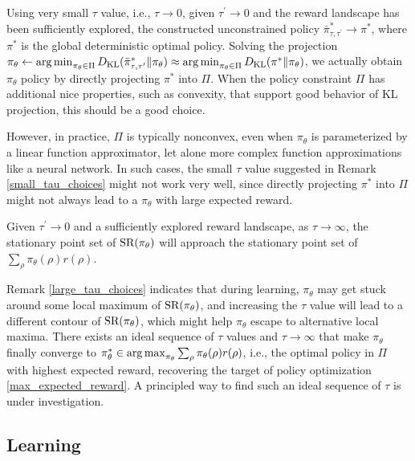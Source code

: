 \documentclass{article} %
\begin{document}
\begin{remk}
\label{small_tau_choices}
Using very small $\tau$ value, i.e., $\tau \to 0$, given $\tau^{\prime} \to 0$ and the reward landscape has been sufficiently explored, the constructed unconstrained policy $\bar{\pi}_{\tau,\tau^{\prime}}^* \to \pi^*$, where $\pi^*$ is the global deterministic optimal policy. Solving the projection $\pi_\theta \leftarrow \operatorname*{arg\,min}_{\pi_\theta \in \Pi}{D_{\mathrm{KL}}(\bar{\pi}_{\tau,\tau^{\prime}}^* \| \pi_\theta}) \approx \operatorname*{arg\,min}_{\pi_\theta \in \Pi}{D_{\mathrm{KL}}(\pi^* \| \pi_\theta})$, we actually obtain $\pi_\theta$ policy by directly projecting $\pi^*$ into $\Pi$. When the policy constraint $\Pi$ has additional nice properties, such as convexity, that support good behavior of KL projection, this should be a good choice.
\end{remk}
  
However, in practice, $\Pi$ is typically nonconvex, even when $\pi_\theta$ is parameterized by a linear function approximator, let alone more complex function approximations like a neural network. In such cases, the small $\tau$ value suggested in Remark \ref{small_tau_choices} might not work very well, since directly projecting $\pi^*$ into $\Pi$ might not always lead to a $\pi_\theta$ with large expected reward.

\begin{remk}
\label{large_tau_choices}
	Given $\tau^{\prime} \to 0$ and a sufficiently explored reward landscape, as $\tau \to \infty$, the stationary point set of $\text{SR}(\pi_\theta)$ will approach the stationary point set of $\sum_{\rho}{ \pi_\theta(\rho) r(\rho) }$.
\end{remk}

Remark \ref{large_tau_choices} indicates that during learning, $\pi_\theta$ may get stuck around some local maximum of $\text{SR}(\pi_\theta)$, and increasing the $\tau$ value will lead to a different contour of $\text{SR}(\pi_\theta)$, which might help $\pi_\theta$ escape to alternative local maxima. There exists an ideal sequence of $\tau$ values and $\tau \to \infty$ that make $\pi_\theta$ finally converge to $\pi_\theta^* \in \operatorname*{arg\,max}_{\pi_\theta}{ \sum_{\rho}{\pi_\theta(\rho) r(\rho)} }$, i.e., the optimal policy in $\Pi$ with highest expected reward, recovering the target of policy optimization \cref{max_expected_reward}. A principled way to find such an ideal sequence of $\tau$ is under investigation.

\subsection{Learning}
\end{document}
